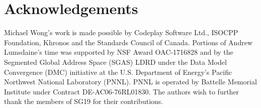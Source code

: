 
\chapter*{Acknowledgements}

Michael Wong's work is made possible by Codeplay Software Ltd., ISOCPP Foundation, Khronos and the Standards Council of Canada.  
%
Portions of Andrew Lumsdaine's time was supported by NSF Award OAC-1716828 and by the
Segmented Global Address Space (SGAS) LDRD under the Data Model Convergence (DMC)
initiative at the U.S. Department of Energy's Pacific Northwest National Laboratory
(PNNL). PNNL is operated by Battelle Memorial Institute under Contract
DE-AC06-76RL01830.
%
The authors wish to further thank the members of SG19 for their contributions.


